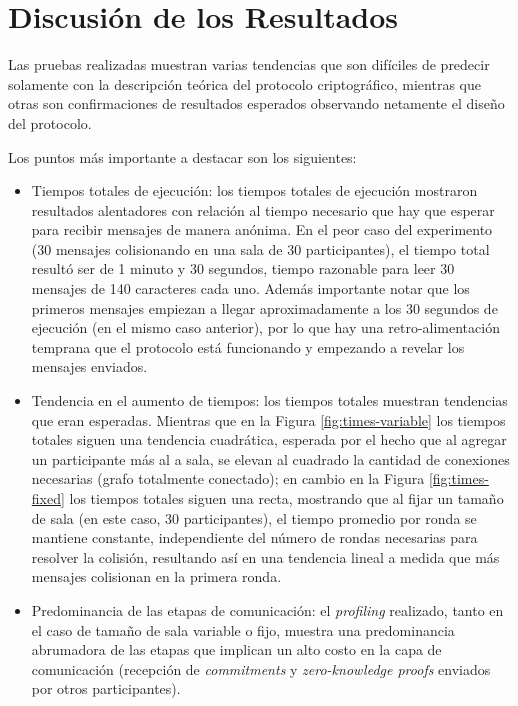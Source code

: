 \section{Discusión de los Resultados}

Las pruebas realizadas muestran varias tendencias que son difíciles de 
predecir solamente con la descripción teórica del protocolo criptográfico, 
mientras que otras son confirmaciones de resultados esperados observando 
netamente el diseño del protocolo.

Los puntos más importante a destacar son los siguientes:

\begin{itemize}
	\item Tiempos totales de ejecución: los tiempos totales de ejecución 
	mostraron resultados alentadores con relación al tiempo necesario que hay 
	que esperar para recibir mensajes de manera anónima. En el peor caso del 
	experimento (30 mensajes colisionando en una sala de 30 participantes), el 
	tiempo total resultó ser de 1 minuto y 30 segundos, tiempo razonable para 
	leer 30 mensajes de 140 caracteres cada uno. Además importante notar que 
	los primeros mensajes empiezan a llegar aproximadamente a los 30 segundos 
	de ejecución (en el mismo caso anterior), por lo que hay una 
	retro-alimentación temprana que el protocolo está funcionando y empezando a 
	revelar los mensajes enviados.
	\item Tendencia en el aumento de tiempos: los tiempos totales muestran 
	tendencias que eran esperadas. Mientras que en la Figura 
	\ref{fig:times-variable} los tiempos totales siguen una tendencia 
	cuadrática, esperada por el hecho que al agregar un participante más al a 
	sala, se elevan al cuadrado la cantidad de conexiones necesarias (grafo 
	totalmente conectado); en cambio en la Figura \ref{fig:times-fixed} 
	los tiempos totales siguen una recta, mostrando que al fijar un tamaño de 
	sala (en este caso, 30 participantes), el tiempo promedio por ronda se 
	mantiene constante, independiente del número de rondas necesarias para 
	resolver la colisión, resultando así en una tendencia lineal a medida que 
	más mensajes colisionan en la primera ronda.
	\item Predominancia de las etapas de comunicación: el \emph{profiling} 
	realizado, tanto en el caso de tamaño de sala variable o fijo, muestra una 
	predominancia abrumadora de las etapas que implican un alto costo en la 
	capa de comunicación (recepción de \emph{commitments} y 
	\emph{zero-knowledge proofs} enviados por otros participantes). 

\end{itemize}
